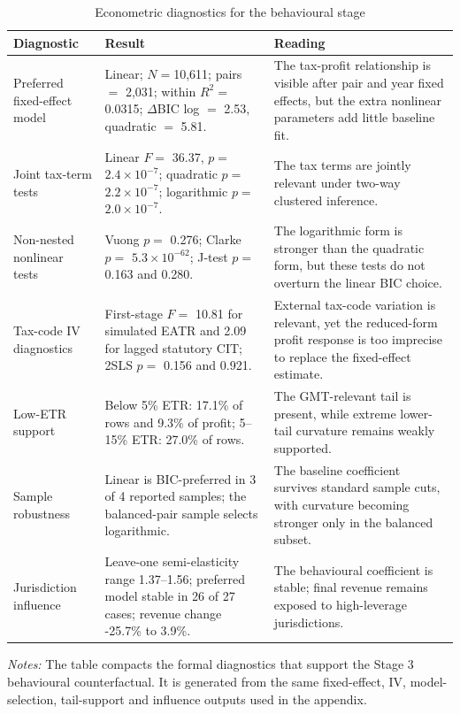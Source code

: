 \begin{table}[H]
\centering
\footnotesize
\setlength{\tabcolsep}{3pt}
\caption[Econometric diagnostics for the behavioural stage]{Econometric diagnostics for the behavioural stage}
\label{tab:stage3_econometric_scorecard}
\begin{tabular}{@{}L{3.2cm}L{5.4cm}L{6.2cm}@{}}
\toprule
Diagnostic & Result & Reading \\
\midrule
Preferred fixed-effect model & Linear; $N=$10,611; pairs $=$ 2,031; within $R^2=$ 0.0315; $\Delta$BIC log $=$ 2.53, quadratic $=$ 5.81. & The tax-profit relationship is visible after pair and year fixed effects, but the extra nonlinear parameters add little baseline fit. \\
Joint tax-term tests & Linear $F=$ 36.37, $p=$ $2.4 \times 10^{-7}$; quadratic $p=$ $2.2 \times 10^{-7}$; logarithmic $p=$ $2.0 \times 10^{-7}$. & The tax terms are jointly relevant under two-way clustered inference. \\
Non-nested nonlinear tests & Vuong $p=$ 0.276; Clarke $p=$ $5.3 \times 10^{-62}$; J-test $p=$ 0.163 and 0.280. & The logarithmic form is stronger than the quadratic form, but these tests do not overturn the linear BIC choice. \\
Tax-code IV diagnostics & First-stage $F=$ 10.81 for simulated EATR and 2.09 for lagged statutory CIT; 2SLS $p=$ 0.156 and 0.921. & External tax-code variation is relevant, yet the reduced-form profit response is too imprecise to replace the fixed-effect estimate. \\
Low-ETR support & Below 5\% ETR: 17.1\% of rows and 9.3\% of profit; 5--15\% ETR: 27.0\% of rows. & The GMT-relevant tail is present, while extreme lower-tail curvature remains weakly supported. \\
Sample robustness & Linear is BIC-preferred in 3 of 4 reported samples; the balanced-pair sample selects logarithmic. & The baseline coefficient survives standard sample cuts, with curvature becoming stronger only in the balanced subset. \\
Jurisdiction influence & Leave-one semi-elasticity range 1.37--1.56; preferred model stable in 26 of 27 cases; revenue change -25.7\% to 3.9\%. & The behavioural coefficient is stable; final revenue remains exposed to high-leverage jurisdictions. \\
\bottomrule
\end{tabular}

\vspace{0.35em}
\noindent\begin{minipage}{\textwidth}
\footnotesize\raggedright\textit{Notes:} The table compacts the formal diagnostics that support the Stage 3 behavioural counterfactual. It is generated from the same fixed-effect, IV, model-selection, tail-support and influence outputs used in the appendix.
\end{minipage}
\end{table}
